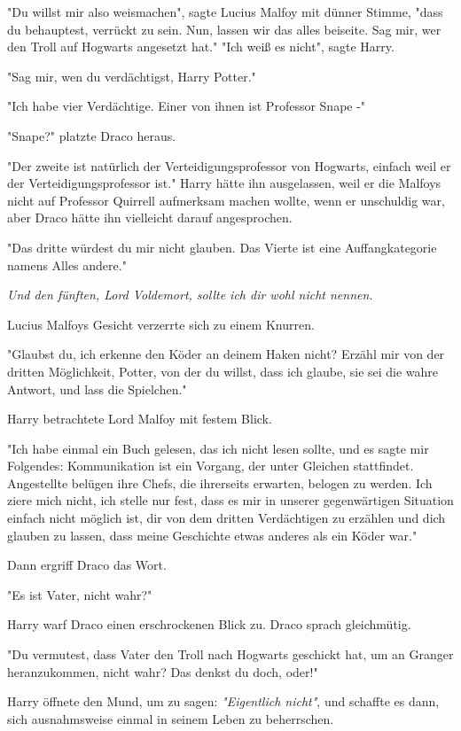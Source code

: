 {"Du willst mir also weismachen", sagte Lucius Malfoy mit dünner Stimme, "dass du behauptest, verrückt zu sein. Nun, lassen wir das alles beiseite. Sag mir, wer den Troll auf Hogwarts angesetzt hat." "Ich weiß es nicht", sagte Harry.

"Sag mir, wen du verdächtigst, Harry Potter."

"Ich habe vier Verdächtige. Einer von ihnen ist Professor Snape -"

"Snape?" platzte Draco heraus.

"Der zweite ist natürlich der Verteidigungsprofessor von Hogwarts, einfach weil er der Verteidigungsprofessor ist." Harry hätte ihn ausgelassen, weil er die Malfoys nicht auf Professor Quirrell aufmerksam machen wollte, wenn er unschuldig war, aber Draco hätte ihn vielleicht darauf angesprochen.

"Das dritte würdest du mir nicht glauben. Das Vierte ist eine Auffangkategorie namens Alles andere."

\emph{Und den fünften, Lord Voldemort, sollte ich dir wohl nicht nennen.}

Lucius Malfoys Gesicht verzerrte sich zu einem Knurren.

"Glaubst du, ich erkenne den Köder an deinem Haken nicht? Erzähl mir von der dritten Möglichkeit, Potter, von der du willst, dass ich glaube, sie sei die wahre Antwort, und lass die Spielchen."

Harry betrachtete Lord Malfoy mit festem Blick.

"Ich habe einmal ein Buch gelesen, das ich nicht lesen sollte, und es sagte mir Folgendes: Kommunikation ist ein Vorgang, der unter Gleichen stattfindet. Angestellte belügen ihre Chefs, die ihrerseits erwarten, belogen zu werden. Ich ziere mich nicht, ich stelle nur fest, dass es mir in unserer gegenwärtigen Situation einfach nicht möglich ist, dir von dem dritten Verdächtigen zu erzählen und dich glauben zu lassen, dass meine Geschichte etwas anderes als ein Köder war."

Dann ergriff Draco das Wort.

"Es ist Vater, nicht wahr?"

Harry warf Draco einen erschrockenen Blick zu. Draco sprach gleichmütig.

"Du vermutest, dass Vater den Troll nach Hogwarts geschickt hat, um an Granger heranzukommen, nicht wahr? Das denkst du doch, oder!"

Harry öffnete den Mund, um zu sagen: \emph{"Eigentlich nicht"}, und schaffte es dann, sich ausnahmsweise einmal in seinem Leben zu beherrschen.

}
